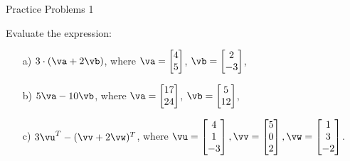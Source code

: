  \begin{center}\begin{large} Practice Problems 1 \end{large}\end{center}
 \bigskip


% 

\begin{problem}
    Evaluate the expression:

    \begin{enumerate}
        \item[a) ] $3\cdot (\va + 2\vb) $,  where $\va= \begin{bmatrix} 4 \\ 5\end{bmatrix} $, $\vb= \begin{bmatrix} 2 \\ -3 \end{bmatrix} $,
        
        \item[b) ] $5\va - 10\vb $,  where $\va= \begin{bmatrix} 17 \\ 24 \end{bmatrix} $, $\vb= \begin{bmatrix} 5 \\ 12 \end{bmatrix} $,
        
        \item[c) ] $3\vu^T-(\vv+2\vw)^T$, where $\vu= \begin{bmatrix}4\\1\\-3 \end{bmatrix}, \vv= \begin{bmatrix}5\\0\\2 \end{bmatrix}, \vw= \begin{bmatrix}1\\3\\-2 \end{bmatrix}$.
    \end{enumerate}
\end{problem}

\medskip

